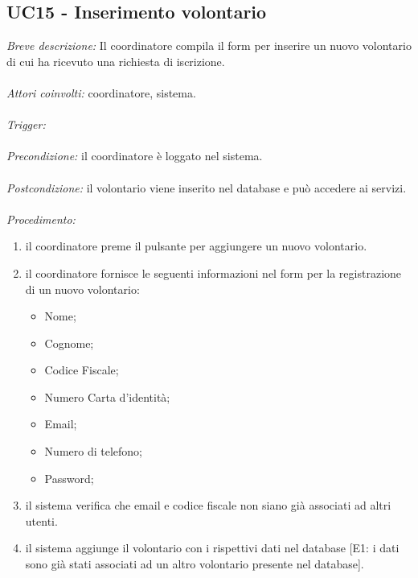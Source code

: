 \subsection{UC15 - Inserimento volontario}
\textit{Breve descrizione:} Il coordinatore compila il form per inserire un nuovo volontario di cui ha ricevuto una richiesta di iscrizione. 
\\
\\
\textit{Attori coinvolti:} coordinatore, sistema.
\\
\\
\textit{Trigger:}
\\
\\
\textit{Precondizione:} il coordinatore è loggato nel sistema.
\\
\\
\textit{Postcondizione:} il volontario viene inserito nel database e può accedere ai servizi.
\\
\\
\textit{Procedimento:}
\begin{enumerate}
	\item il coordinatore preme il pulsante per aggiungere un nuovo volontario.
	\item il coordinatore fornisce le seguenti informazioni nel form per la registrazione di un nuovo volontario:
	\begin{itemize}
		\item Nome;
		\item Cognome;
		\item Codice Fiscale;
		\item Numero Carta d'identità;
		\item Email;
		\item Numero di telefono;
		\item Password;
	\end{itemize}
	\item il sistema verifica che email e codice fiscale non siano già associati ad altri utenti.
	\item il sistema aggiunge il volontario con i rispettivi dati nel database [E1: i dati sono già stati associati ad un altro volontario presente nel database].
\end{enumerate}


